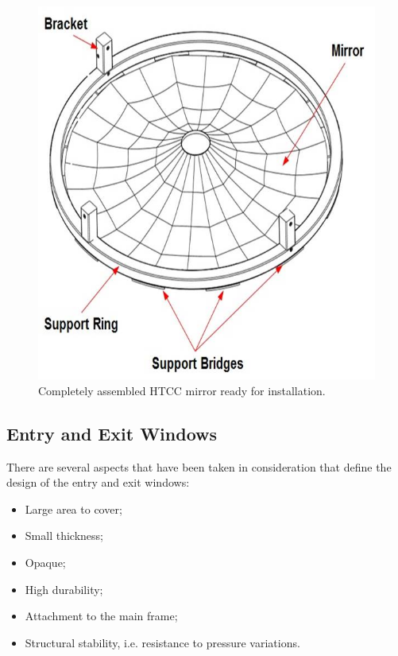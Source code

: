 \begin{figure}[ht]
    \centering
        \includegraphics[width=1.0\linewidth]{images/Support_Ring_2.jpg}
    \caption{Completely assembled HTCC mirror ready for installation.}
    \label{fig:Ring_to_Mirror}
\end{figure}
 
\subsection {Entry and Exit Windows}

There are several aspects that have been taken in consideration that define the design of the entry and exit windows:

\begin{itemize}
    \item Large area to cover;
    \item Small thickness;
    \item Opaque;
    \item High durability;
    \item Attachment to the main frame;
    \item Structural stability, i.e. resistance to pressure variations.
    \end{itemize}

